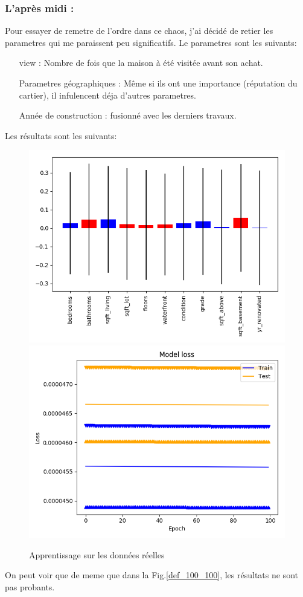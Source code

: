 \subsubsection*{L'après midi :}
Pour essayer de remetre de l'ordre dans ce chaos,
j'ai décidé de retier les parametres qui me paraissent peu significatifs.
Le parametres sont les suivants:
\begin{itemize}
    \item[view :] Nombre de fois que la maison à été visitée avant son achat.
    \item[Parametres géographiques :]
        Même si ils ont une importance (réputation du cartier),
        il infulencent déja d'autres parametres.
    \item[Année de construction :] fusionné avec les derniers travaux.
\end{itemize}

Les résultats sont les suivants:
\begin{figure}[H]
    \center
    \includegraphics[height=\petit]{sources/data/Obj2/real/graphs/remove1_100_100.png}
    \includegraphics[height=\petit]{sources/data/Obj2/real/graphs/remove1_100_100_learn.png}
	\caption{Apprentissage sur les données réelles}
	\label{r1_100_100}
\end{figure}
On peut voir que de meme que dans la Fig.\ref{def_100_100}, les résultats ne sont pas probants.
